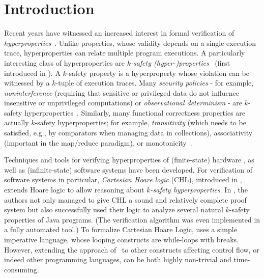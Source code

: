 \section{Introduction}
Recent years have witnessed an increased interest in formal verification of
\emph{hyperproperties}~\cite{ClarksonS08}. Unlike properties, whose validity depends on a single
execution trace, hyperproperties can relate multiple program executions. A
particularly interesting class of hyperproperties are \emph{$k$-safety
  (hyper-)properties}~\cite{FinkbeinerHT19CanonicalKsafety,SousaD16,AgrawalB16RuntimeKSafetyHLTL,ClarksonS08}
(first introduced in \cite{ClarksonS08}).
A $k$-safety property is a hyperproperty whose violation can be witnessed by a
$k$-tuple of execution traces.  Many \emph{security policies} - for example,
\emph{noninterference} (requiring that sensitive or privileged data do not influence
insensitive or unprivileged computations)
or
\emph{observational determinism} 
- are $k$-safety hyperproperties~\cite{ClarksonFKMRS14,ClarksonFKMRS14TR,ClarksonS08}.
Similarly, many functional correctness properties are actually $k$-safety
hyperproperties; for example, \emph{transitivity} (which needs to be satisfied,
e.g., by comparators when managing data in collections), associativity
(important in the map/reduce paradigm), or monotonicity~\cite{SousaD16}.


Techniques and tools for verifying hyperproperties of (finite-state) hardware
\cite{CoenenFST19,FinkbeinerRS15}, as well as (infinite-state) software
systems have been developed.  For verification of software systems in
particular, \emph{Cartesian Hoare logic} (CHL), introduced in \cite{SousaD16},
extends Hoare logic to allow reasoning about \emph{$k$-safety
  hyperproperties}. In \cite{SousaD16}, the authors not only managed to give
CHL a sound and relatively complete proof system but also successfully used
their logic to analyze several natural $k$-safety properties of Java
programs. (The verification algorithm was even implemented in a fully automated
tool.) To formalize Cartesian Hoare Logic, \cite{SousaD16} uses a simple
imperative language, whose looping constructs are while-loops with
breaks. However, extending the approach of~\cite{SousaD16} to
other constructs affecting control flow, or indeed other programming
languages, can be both highly non-trivial and time-consuming.


